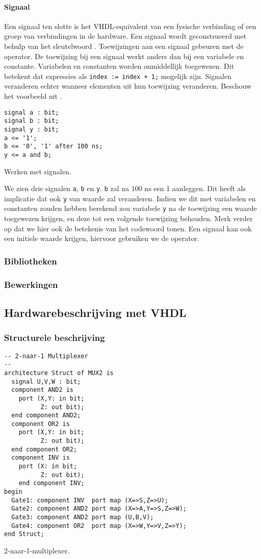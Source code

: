 \paragraph{Signaal}Een signaal ten slotte is het VHDL-equivalent van een fysische verbinding of een groep van verbindingen in de hardware. Een signaal wordt geconstrueerd met behulp van het sleutelwoord . Toewijzingen aan een signaal gebeuren met de \vhdltermen{<=} operator. De toewijzing bij een signaal werkt anders dan bij een variabele en constante. Variabelen en constanten worden onmiddellijk toegewezen. Dit betekent dat expressies als \verb/index := index + 1;/ mogelijk zijn. Signalen veranderen echter wanneer elementen uit hun toewijzing veranderen. Beschouw het voorbeeld uit .
\begin{vhdlcode}[hbt]
\begin{lstlisting}
signal a : bit;
signal b : bit;
signal y : bit;
a <= '1';
b <= '0', '1' after 100 ns;
y <= a and b;
\end{lstlisting}
\caption{Werken met signalen.}
\label{lst:variabele}
\end{vhdlcode}
We zien drie signalen \verb+a+, \verb+b+ en \verb+y+. \verb+b+ zal na $100\mbox{ ns}$ een 1 aanleggen. Dit heeft als implicatie dat ook \verb+y+ van waarde zal veranderen. Indien we dit met variabelen en constanten zouden hebben berekend zou variabele \verb+y+ na de toewijzing een waarde toegewezen krijgen, en deze tot een volgende toewijzing behouden. Merk verder op dat we hier ook de betekenis van het codewoord  tonen. Een signaal kan ook een initiele waarde krijgen, hiervoor gebruiken we de \vhdltermen{:=} operator.
\subsubsection{Bibliotheken}
\subsubsection{Bewerkingen}
\subsection{Hardwarebeschrijving met VHDL}
\subsubsection{Structurele beschrijving}
\begin{vhdlcode}[hbt]
\centering
\begin{lstlisting}
-- 2-naar-1 Multiplexer
--
architecture Struct of MUX2 is
  signal U,V,W : bit;
  component AND2 is
    port (X,Y: in bit;
          Z: out bit);
  end component AND2;
  component OR2 is
    port (X,Y: in bit;
          Z: out bit);
  end component OR2;
  component INV is
    port (X: in bit;
          Z: out bit);
    end component INV;
begin
  Gate1: component INV  port map (X=>S,Z=>U);
  Gate2: component AND2 port map (X=>A,Y=>S,Z=>W);
  Gate3: component AND2 port map (U,B,V);
  Gate4: component OR2  port map (X=>W,Y=>V,Z=>Y);
end Struct;
\end{lstlisting}
\caption{2-naar-1-multiplexer.}
\label{vhdl:bToAMultiplexer}
\end{vhdlcode}
